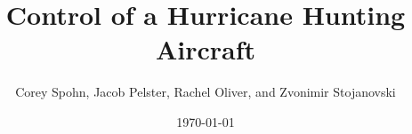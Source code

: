 \documentclass[aspectratio=169]{beamer}
\begin{document}

\title[Your Short Title]{Control of a Hurricane Hunting Aircraft}
\author{Corey Spohn, Jacob Pelster, Rachel Oliver, and Zvonimir Stojanovski}
\date{\today}

\begin{frame}
  \titlepage
\end{frame}
\end{document}
